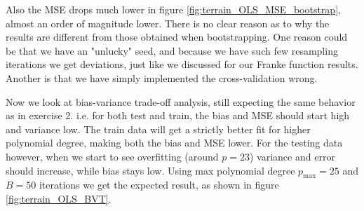 \documentclass[reprint,english,notitlepage,aps,nobalancelastpage,nofootinbib]{revtex4-1}  %
\begin{document}
Also the MSE drops much lower in figure \ref{fig:terrain_OLS_MSE_bootstrap}, almost an order of magnitude lower. There is no clear reason as to why the results are different from those obtained when bootstrapping. One reason could be that we have an "unlucky" seed, and because we have such few resampling iterations we get deviations, just like we discussed for our Franke function results. Another is that we have simply implemented the cross-validation wrong.

Now we look at bias-variance trade-off analysis, still expecting the same behavior as in exercise 2. i.e. for both test and train, the bias and MSE should start high and variance low. The train data will get a strictly better fit for higher polynomial degree, making both the bias and MSE lower. For the testing data however, when we start to see overfitting (around $p=23$) variance and error should increase, while bias stays low. Using max polynomial degree $p_\text{max}=25$ and $B=50$ iterations we get the expected result, as shown in figure \ref{fig:terrain_OLS_BVT}.
\end{document}

